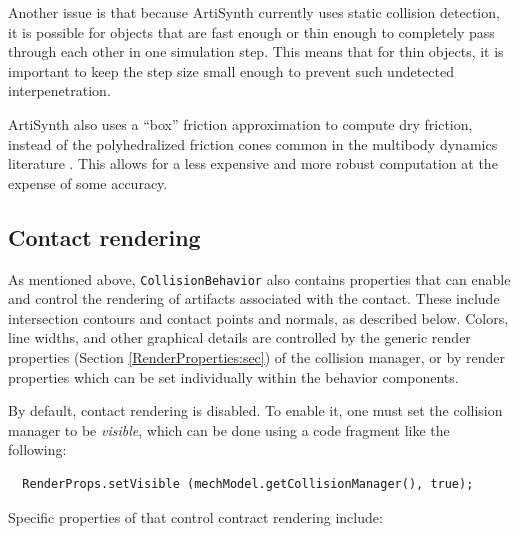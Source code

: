 Another issue is that because ArtiSynth currently uses static
collision detection, it is possible for objects that are fast enough
or thin enough to completely pass through each other in one simulation
step. This means that for thin objects, it is important to keep the
step size small enough to prevent such undetected interpenetration.

ArtiSynth also uses a ``box'' friction approximation
\cite{Lacoursiere07} to compute dry friction, instead of the
polyhedralized friction cones common in the multibody dynamics
literature \cite{AnitescuPotra2002,PotraEtAlTrapezoidal2006}.  This
allows for a less expensive and more robust computation at the expense
of some accuracy.

\subsection{Contact rendering}
\label{ContactRendering:sec}

As mentioned above, {\tt CollisionBehavior} also contains properties
that can enable and control the rendering of artifacts associated with
the contact. These include intersection contours and contact points
and normals, as described below. Colors, line widths, and other
graphical details are controlled by the generic render properties
(Section \ref{RenderProperties:sec}) of the collision manager, or by
render properties which can be set individually within the behavior
components.

By default, contact rendering is disabled. To enable it, one must set
the collision manager to be {\it visible}, which can be done using a code
fragment like the following:
%
\begin{verbatim}
  RenderProps.setVisible (mechModel.getCollisionManager(), true);
\end{verbatim}
%

Specific properties of
 that control
contract rendering include:


